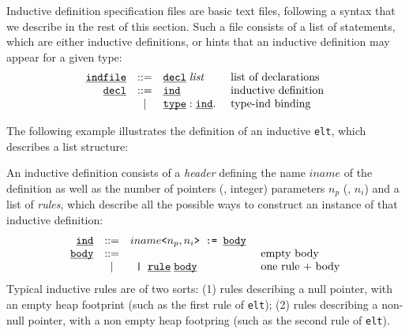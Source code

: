 Inductive definition specification files are basic text files, following
a syntax that we describe in the rest of this section.
Such a file consists of a list of statements, which are either
inductive definitions, or hints that an inductive definition may
appear for a given type:
\[
\begin{array}{rcll}
  \underline{\smash{\texttt{indfile}}}
  & ::=
  & \underline{\smash{\texttt{decl}}} \; \text{{\em list}}
  & \text{ list of declarations}
  \\
  \underline{\smash{\texttt{decl}}}
  & ::=
  & \underline{\smash{\texttt{ind}}}
  & \text{ inductive definition}
  \\
  & |
  & \underline{\smash{\texttt{type}}} : \underline{\smash{\texttt{ind}}} .
  & \text{ type-ind binding}
  \\
\end{array}
\]

The following example illustrates the definition of an inductive
\texttt{elt}, which describes a list structure:


An inductive definition consists of a {\em header} defining the name
\( iname \) of the definition as well as the number of pointers
(\resp, integer) parameters \( n_p \) (\resp, \( n_i \)) and a list
of {\em rules}, which describe all the possible ways to construct an
instance of that inductive definition:
\[
\begin{array}{rcll}
  \underline{\smash{\texttt{ind}}}
  & ::=
  & iname \texttt{<} n_p, n_i \texttt{> := } \underline{\smash{\texttt{body}}}
  &
  \\
  \underline{\smash{\texttt{body}}}
  & ::=
  &
  & \text{ empty body}
  \\
  & |
  & \texttt{ | } \underline{\smash{\texttt{rule}}} \; \underline{\smash{\texttt{body}}}
  & \text{ one rule + body}
  \\
\end{array}
\]
Typical inductive rules are of two sorts:
(1) rules describing a null pointer, with an empty heap footprint
(such as the first rule of \texttt{elt});
(2) rules describing a non-null pointer, with a non empty heap footpring
(such as the second rule of \texttt{elt}).

